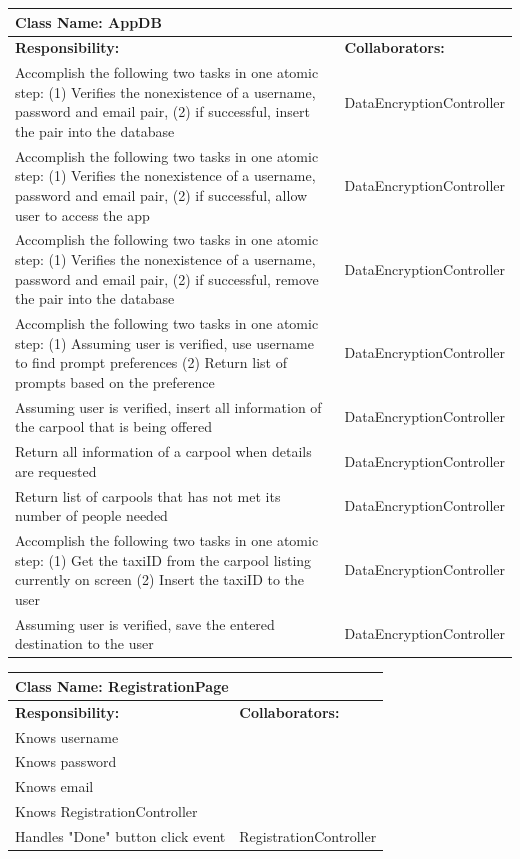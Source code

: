 \documentclass[]{article}
\begin{document}
	\begin{table}[H]
	\centering
	\begin{tabular}{|p{6cm}|p{6cm}|}
	\hline 
		\multicolumn{2}{|l|}{\textbf{Class Name: AppDB}} \\
	\hline
	\textbf{Responsibility:} & \textbf{Collaborators:} \\
	\hline
	Accomplish the following two tasks in one atomic step: (1) Verifies the nonexistence of a username, password and email pair, (2) if successful, insert the pair into the database & DataEncryptionController \\ \hline
	Accomplish the following two tasks in one atomic step: (1) Verifies the nonexistence of a username, password and email pair, (2) if successful, allow user to access the app & DataEncryptionController\\ \hline
	Accomplish the following two tasks in one atomic step: (1) Verifies the nonexistence of a username, password and email pair, (2) if successful, remove the pair into the database & DataEncryptionController\\ \hline
	Accomplish the following two tasks in one atomic step: (1) Assuming user is verified, use username to find prompt preferences (2) Return list of prompts based on the preference & DataEncryptionController\\ \hline
	Assuming user is verified, insert all information of the carpool that is being offered & DataEncryptionController\\ \hline
	Return all information of a carpool when details are requested & DataEncryptionController\\ \hline
	Return list of carpools that has not met its number of people needed & DataEncryptionController\\ \hline
	Accomplish the following two tasks in one atomic step: (1) Get the taxiID from the carpool listing currently on screen (2) Insert the taxiID to the user & DataEncryptionController\\ \hline
	Assuming user is verified, save the entered destination to the user & DataEncryptionController\\ \hline
	\end{tabular}
	\end{table}%


	
	\begin{table}[H]
	\centering
	\begin{tabular}{|p{6cm}|p{6cm}|}
	\hline 
		\multicolumn{2}{|l|}{\textbf{Class Name: RegistrationPage}} \\
	\hline
	\textbf{Responsibility:} & \textbf{Collaborators:} \\
	\hline 
	Knows username &\\ \hline 
	Knows password &\\ \hline
	Knows email &\\ \hline
	Knows RegistrationController &\\ \hline
	Handles "Done" button click event  & RegistrationController\\ \hline
	\end{tabular}
	\end{table}
	
\end{document}
